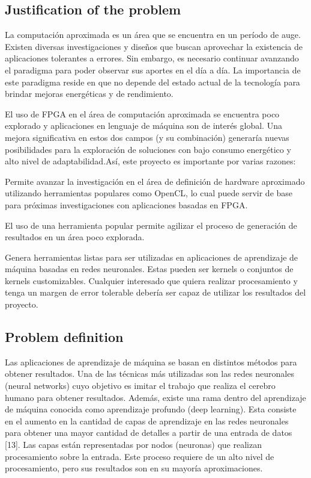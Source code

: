 \subsection{Justification of the problem}

La computación aproximada es un área que se encuentra en un período de auge. Existen diversas
investigaciones y diseños que buscan aprovechar la existencia de aplicaciones tolerantes a errores. Sin
embargo, es necesario continuar avanzando el paradigma para poder observar sus aportes en el día a
día. La importancia de este paradigma reside en que no depende del estado actual de la tecnología para
brindar mejoras energéticas y de rendimiento.

El uso de FPGA en el área de computación aproximada se encuentra poco explorado y aplicaciones en
lenguaje de máquina son de interés global. Una mejora significativa en estos dos campos (y su
combinación) generaría nuevas posibilidades para la exploración de soluciones con bajo consumo
energético y alto nivel de adaptabilidad.Así, este proyecto es importante por varias razones:

\begin{compactitem}
    \item Permite avanzar la investigación en el área de definición de hardware aproximado utilizando
herramientas populares como OpenCL, lo cual puede servir de base para próximas
investigaciones con aplicaciones basadas en FPGA. 
    \item El uso de una herramienta popular permite agilizar el proceso de generación de resultados en un área poco explorada.
    \item Genera herramientas listas para ser utilizadas en aplicaciones de aprendizaje de máquina
basadas en redes neuronales. Estas pueden ser kernels o conjuntos de kernels customizables.
Cualquier interesado que quiera realizar procesamiento y tenga un margen de error tolerable
debería ser capaz de utilizar los resultados del proyecto.
\end{compactitem}



\subsection{Problem definition}

Las aplicaciones de aprendizaje de máquina se basan en distintos métodos para obtener resultados. Una
de las técnicas más utilizadas son las redes neuronales (neural networks) cuyo objetivo es imitar el
trabajo que realiza el cerebro humano para obtener resultados. Además, existe una rama dentro del
aprendizaje de máquina conocida como aprendizaje profundo (deep learning). Esta consiste en el
aumento en la cantidad de capas de aprendizaje en las redes neuronales para obtener una mayor
cantidad de detalles a partir de una entrada de datos [13]. Las capas están representadas por nodos
(neuronas) que realizan procesamiento sobre la entrada. Este proceso requiere de un alto nivel de
procesamiento, pero sus resultados son en su mayoría aproximaciones.

